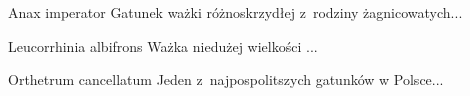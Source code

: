 \documentclass[a4paper]{article}
\newenvironment{Description}{%
 \begin{list}{}{\renewcommand{\makelabel}[1]{\mbox{\itshape ##1:}\hfil}
 \setlength{\labelwidth}{1.4in}
 \setlength{\leftmargin}{\labelwidth+\labelsep}}}{\end{list}}
\begin{document}
\begin{Description}
\item[Anax imperator] Gatunek ważki różnoskrzydłej z~rodziny żagnicowatych...
\item[Leucorrhinia albifrons] Ważka niedużej wielkości ...
\item[Orthetrum cancellatum] Jeden z~najpospolitszych gatunków w Polsce...
\end{Description}
\end{document}
